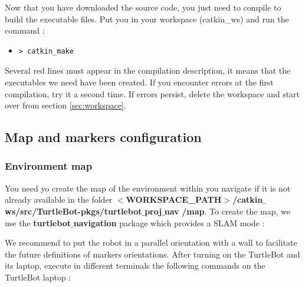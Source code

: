 \documentclass[10pt,a4paper]{article}
\begin{document}
Now that you have downloaded the source code, you just need to compile to build the executable files. Put you in your workspace (catkin\_ws) and run the command : 

\begin{itemize}
\item[]  \begin{verbatim}> catkin_make \end{verbatim}
\end{itemize}

Several red lines must appear in the compilation description, it means that the executables we need have been created. If you encounter errors at the first compilation, try it a second time. If errors persist, delete the workspace and start over from section \ref{sec:workspace}. 

\subsection{Map and markers configuration}
\label{sec:mapAndMarkersConfig}

\subsubsection{Environment map}

You need yo create the map of the environment within you navigate if it is not already available in the folder \textbf{$<$WORKSPACE\_PATH$>$/catkin$\_$ws/src/TurtleBot-pkgs/turtlebot$\_$proj$\_$nav} \textbf{/map}. To create the map, we use the \textbf{turtlebot$\_$navigation} package which provides a SLAM mode :


We recommend to put the robot in a parallel orientation with a wall to facilitate the future definitions of markers orientations. After turning on the TurtleBot and its laptop, execute in different terminals the following commands on the TurtleBot laptop :
\end{document}
